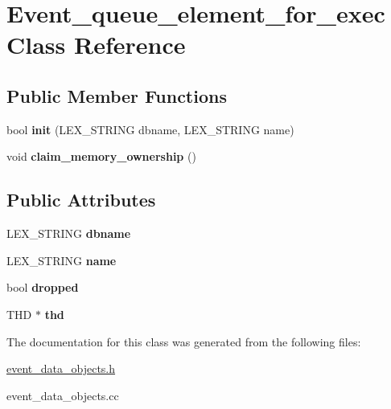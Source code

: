 \hypertarget{classEvent__queue__element__for__exec}{}\section{Event\+\_\+queue\+\_\+element\+\_\+for\+\_\+exec Class Reference}
\label{classEvent__queue__element__for__exec}
\subsection*{Public Member Functions}
\begin{DoxyCompactItemize}
\item 
bool {\bfseries init} (L\+E\+X\+\_\+\+S\+T\+R\+I\+NG dbname, L\+E\+X\+\_\+\+S\+T\+R\+I\+NG name)
\item 
void {\bfseries claim\+\_\+memory\+\_\+ownership} ()
\end{DoxyCompactItemize}
\subsection*{Public Attributes}
\begin{DoxyCompactItemize}
\item 
\mbox{\label{classEvent__queue__element__for__exec_a8e8e920230e922537c6dc25fdb67ea3d}} 
L\+E\+X\+\_\+\+S\+T\+R\+I\+NG {\bfseries dbname}
\item 
\mbox{\label{classEvent__queue__element__for__exec_a98812ac390562714081cb4259c97aa8a}} 
L\+E\+X\+\_\+\+S\+T\+R\+I\+NG {\bfseries name}
\item 
\mbox{\label{classEvent__queue__element__for__exec_aaef2917bbef29aa42572927eda9cc4e7}} 
bool {\bfseries dropped}
\item 
\mbox{\label{classEvent__queue__element__for__exec_a3d6ecc0f2ad4c892bb321129f0ed07a0}} 
T\+HD $\ast$ {\bfseries thd}
\end{DoxyCompactItemize}


The documentation for this class was generated from the following files\+:\begin{DoxyCompactItemize}
\item 
\mbox{\hyperlink{event__data__objects_8h}{event\+\_\+data\+\_\+objects.\+h}}\item 
event\+\_\+data\+\_\+objects.\+cc\end{DoxyCompactItemize}
